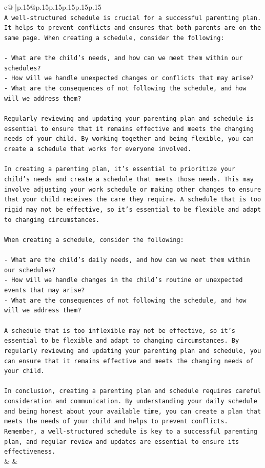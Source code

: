 \documentclass{article}
\begin{document}
{\begin{supertabular}{c@{$\;$}|p{.15\linewidth}@{}p{.15\linewidth}p{.15\linewidth}p{.15\linewidth}p{.15\linewidth}p{.15\linewidth}}
{{{\\ 
\texttt{A well{-}structured schedule is crucial for a successful parenting plan. It helps to prevent conflicts and ensures that both parents are on the same page. When creating a schedule, consider the following:} \\
\\ 
\texttt{{-} What are the child's needs, and how can we meet them within our schedules?} \\
\texttt{{-} How will we handle unexpected changes or conflicts that may arise?} \\
\texttt{{-} What are the consequences of not following the schedule, and how will we address them?} \\
\\ 
\texttt{Regularly reviewing and updating your parenting plan and schedule is essential to ensure that it remains effective and meets the changing needs of your child. By working together and being flexible, you can create a schedule that works for everyone involved.} \\
\\ 
\texttt{In creating a parenting plan, it's essential to prioritize your child's needs and create a schedule that meets those needs. This may involve adjusting your work schedule or making other changes to ensure that your child receives the care they require. A schedule that is too rigid may not be effective, so it's essential to be flexible and adapt to changing circumstances.} \\
\\ 
\texttt{When creating a schedule, consider the following:} \\
\\ 
\texttt{{-} What are the child's daily needs, and how can we meet them within our schedules?} \\
\texttt{{-} How will we handle changes in the child's routine or unexpected events that may arise?} \\
\texttt{{-} What are the consequences of not following the schedule, and how will we address them?} \\
\\ 
\texttt{A schedule that is too inflexible may not be effective, so it's essential to be flexible and adapt to changing circumstances. By regularly reviewing and updating your parenting plan and schedule, you can ensure that it remains effective and meets the changing needs of your child.} \\
\\ 
\texttt{In conclusion, creating a parenting plan and schedule requires careful consideration and communication. By understanding your daily schedule and being honest about your available time, you can create a plan that meets the needs of your child and helps to prevent conflicts. Remember, a well{-}structured schedule is key to a successful parenting plan, and regular review and updates are essential to ensure its effectiveness.} \\
            }
        }
    }
    & & \\ \\


\end{supertabular}}
\end{document}
